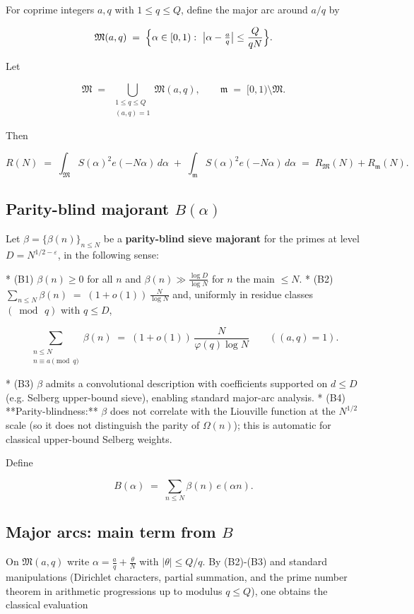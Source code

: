 \documentclass[11pt]{article}
\theoremstyle{definition}
\theoremstyle{remark}
\begin{document}
For coprime integers $a,q$ with $1\le q\le Q$, define the major arc around $a/q$ by

$$
\mathfrak M(a,q)\;=\;\Bigl\{\alpha\in[0,1):\ \bigl|\alpha-\tfrac{a}{q}\bigr|
\le \frac{Q}{qN}\Bigr\}.
$$

Let

$$
\mathfrak M\;=\;\bigcup_{\substack{1\le q\le Q\\ (a,q)=1}}\mathfrak M(a,q),
\qquad
\mathfrak m\;=\;[0,1)\setminus\mathfrak M .
$$

Then

$$
R(N)\;=\;\int_{\mathfrak M} S(\alpha)^2 e(-N\alpha)\,d\alpha\;+\;
\int_{\mathfrak m} S(\alpha)^2 e(-N\alpha)\,d\alpha
\;=\;R_{\mathfrak M}(N)+R_{\mathfrak m}(N).
$$


\subsection*{Parity-blind majorant $B(\alpha)$}

Let $\beta=\{\beta(n)\}_{n\le N}$ be a \textbf{parity-blind sieve majorant} for the primes at level $D=N^{1/2-\varepsilon}$, in the following sense:

* (B1) $\beta(n)\ge 0$ for all $n$ and $\beta(n)\gg \tfrac{\log D}{\log N}$ for $n$ the main $\le N$.
* (B2) $\displaystyle \sum_{n\le N}\beta(n)\;=\;(1+o(1))\,\frac{N}{\log N}$ and, uniformly in residue classes $(\bmod\,q)$ with $q\le D$,

$$
\sum_{\substack{n\le N\\ n\equiv a\!\!\!\pmod q}}\beta(n)
\;=\;(1+o(1))\,\frac{N}{\varphi(q)\log N}\qquad ((a,q)=1).
$$

* (B3) $\beta$ admits a convolutional description with coefficients supported on $d\le D$ (e.g. Selberg upper-bound sieve), enabling standard major-arc analysis.
* (B4) **Parity-blindness:** $\beta$ does not correlate with the Liouville function at the $N^{1/2}$ scale (so it does not distinguish the parity of $\Omega(n)$); this is automatic for classical upper-bound Selberg weights.

Define

$$
B(\alpha)\;=\;\sum_{n\le N}\beta(n)\,e(\alpha n).
$$


\subsection*{Major arcs: main term from $B$}

On $\mathfrak M(a,q)$ write $\alpha=\tfrac{a}{q}+\tfrac{\theta}{N}$ with
$|\theta|\le Q/q$. By (B2)-(B3) and standard manipulations (Dirichlet characters, partial summation, and the prime number theorem in arithmetic progressions up to modulus $q\le Q$), one obtains the classical evaluation
\end{document}
